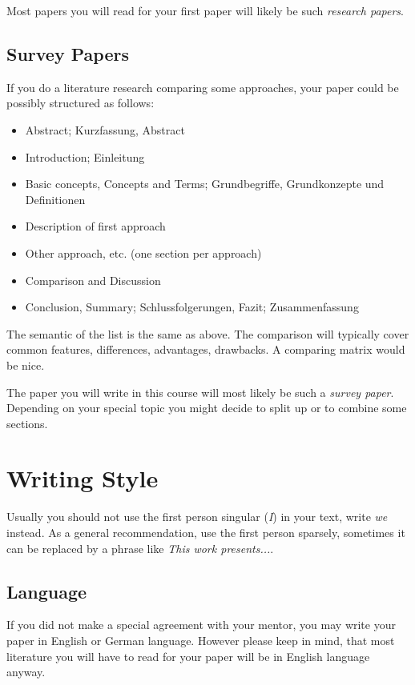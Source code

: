 \documentclass[10pt,a4paper,twoside,twocolumn]{article}
\begin{document}
Most papers you will read for your first paper will likely be such
\emph{research papers}.

\subsection{Survey Papers}

If you do a literature research comparing some approaches, your
paper could be possibly structured as follows:

\begin{itemize}
\item Abstract; Kurzfassung, Abstract
\item Introduction; Einleitung
\item Basic concepts, Concepts and Terms; Grundbegriffe, Grundkonzepte und Definitionen
\item Description of first approach
\item Other approach, etc. (one section per approach)
\item Comparison and Discussion
\item Conclusion, Summary; Schlussfolgerungen, Fazit; Zusammenfassung
\end{itemize}

The semantic of the list is the same as above. The comparison will
typically cover common features, differences, advantages, drawbacks.
A comparing matrix would be nice.

The paper you will write in this course will most likely be such a
\emph{survey paper}. Depending on your special topic you might
decide to split up or to combine some sections.


\section{Writing Style\label{sec:writingstyle}}

Usually you should not use the first person singular (\emph{I}) in
your text, write \emph{we} instead. As a general recommendation, use
the first person sparsely, sometimes it can be replaced by a phrase
like \emph{This work presents...}.

\subsection{Language}

If you did not make a special agreement with your mentor, you may
write your paper in English or German language. However please keep
in mind, that most literature you will have to read for your paper
will be in English language anyway.
\end{document}

